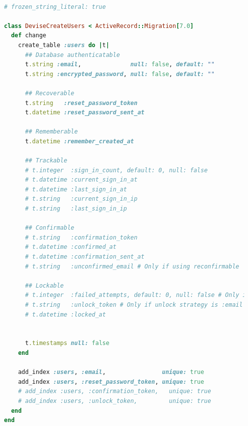   \begin{lstlisting}[language=Ruby, caption=DeviseCreateUsers]

  # frozen_string_literal: true

  class DeviseCreateUsers < ActiveRecord::Migration[7.0]
    def change
      create_table :users do |t|
        ## Database authenticatable
        t.string :email,              null: false, default: ""
        t.string :encrypted_password, null: false, default: ""

        ## Recoverable
        t.string   :reset_password_token
        t.datetime :reset_password_sent_at

        ## Rememberable
        t.datetime :remember_created_at

        ## Trackable
        # t.integer  :sign_in_count, default: 0, null: false
        # t.datetime :current_sign_in_at
        # t.datetime :last_sign_in_at
        # t.string   :current_sign_in_ip
        # t.string   :last_sign_in_ip

        ## Confirmable
        # t.string   :confirmation_token
        # t.datetime :confirmed_at
        # t.datetime :confirmation_sent_at
        # t.string   :unconfirmed_email # Only if using reconfirmable

        ## Lockable
        # t.integer  :failed_attempts, default: 0, null: false # Only if lock strategy is :failed_attempts
        # t.string   :unlock_token # Only if unlock strategy is :email or :both
        # t.datetime :locked_at


        t.timestamps null: false
      end

      add_index :users, :email,                unique: true
      add_index :users, :reset_password_token, unique: true
      # add_index :users, :confirmation_token,   unique: true
      # add_index :users, :unlock_token,         unique: true
    end
  end





  \end{lstlisting}
